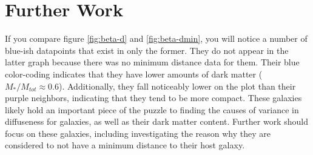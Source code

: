 \section{Further Work}

If you compare figure \ref{fig:beta-d} and \ref{fig:beta-dmin}, you will notice a number of blue-ish datapoints that exist in only the former. They do not appear in the latter graph because there was no minimum distance data for them. Their blue color-coding indicates that they have lower amounts of dark matter ($M_{*} / M_{tot} \approx 0.6$). Additionally, they fall noticeably lower on the plot than their purple neighbors, indicating that they tend to be more compact. These galaxies likely hold an important piece of the puzzle to finding the causes of variance in diffuseness for galaxies, as well as their dark matter content. Further work should focus on these galaxies, including investigating the reason why they are considered to not have a minimum distance to their host galaxy. 


